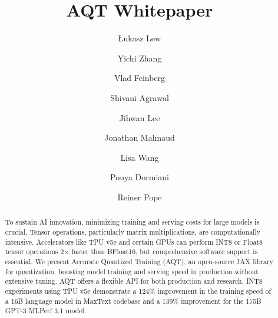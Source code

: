 \documentclass{article}
\title{AQT Whitepaper}
\date{}
\author{
{\L}ukasz Lew \\
\and
Yichi Zhang \\
\and
Vlad Feinberg\\
\and
Shivani Agrawal\\
\and
Jihwan Lee\\
\and
Jonathan Malmaud\\
\and
Lisa Wang\\
\and
Pouya Dormiani\\
\and
Reiner Pope
}
\begin{document}
\maketitle

\begin{abstract}
To sustain AI innovation, minimizing training and serving costs for large models is crucial.
Tensor operations, particularly matrix multiplications, are computationally intensive.
Accelerators like TPU v5e and certain GPUs can perform INT8 or Float8 tensor operations 2$\times$ faster than BFloat16, but comprehensive software support is essential.
We present Accurate Quantized Training (AQT), an open-source JAX library for quantization, boosting model training and serving speed in production without extensive tuning.
AQT offers a flexible API for both production and research.
INT8 experiments using TPU v5e demonstrate a 124\% improvement in the training speed of a 16B language model in MaxText codebase and a 139\% improvement for the 175B GPT-3 MLPerf 3.1 model.
\end{abstract}



% 
% 
\end{document}
